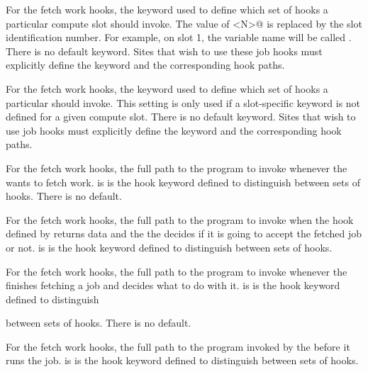 \begin{description}

\label{param:SlotNJobHookKeyword}
\item[\Macro{SLOT<N>\_JOB\_HOOK\_KEYWORD}]
  For the fetch work hooks,
  the keyword used to define which set of hooks a particular
  compute slot should invoke.
  The value of \verb@<N>@ is replaced by the slot
  identification number. For example, on slot 1, the variable name will be
  called \MacroNI{[SLOT1\_JOB\_HOOK\_KEYWORD}.
  There is no default keyword.
  Sites that wish to use these job hooks must explicitly define the
  keyword and the corresponding hook paths.

\label{param:StartdJobHookKeyword}
\item[\Macro{STARTD\_JOB\_HOOK\_KEYWORD}]
  For the fetch work hooks,
  the keyword used to define which set of hooks a particular
   should invoke.
  This setting is only used if a slot-specific keyword is not defined
  for a given compute slot.
  There is no default keyword.
  Sites that wish to use job hooks must explicitly define the
  keyword and the corresponding hook paths.

\label{param:HookFetchWork}
\item[\Macro{<Keyword>\_HOOK\_FETCH\_WORK}]
  For the fetch work hooks,
  the full path to the program to invoke whenever the 
  wants to fetch work.
   is is the hook keyword defined to distinguish
  between sets of hooks.
  There is no default.

\label{param:HookReplyFetch}
\item[\Macro{<Keyword>\_HOOK\_REPLY\_FETCH}]
  For the fetch work hooks,
  the full path to the program to invoke when the hook defined by
    returns data and the the 
  decides if it is going to accept the fetched job or not.
   is is the hook keyword defined to distinguish
  between sets of hooks.

\label{param:HookReplyClaim}
\item[\Macro{<Keyword>\_HOOK\_REPLY\_CLAIM}]
  For the fetch work hooks,
  the full path to the program to invoke whenever the 
  finishes fetching a job and decides what to do with it.
   is is the hook keyword defined to distinguish

  between sets of hooks.
  There is no default.

\label{param:HookPrepareJob}
\item[\Macro{<Keyword>\_HOOK\_PREPARE\_JOB}]
  For the fetch work hooks,
  the full path to the program invoked by the  before it
  runs the job.
   is is the hook keyword defined to distinguish
  between sets of hooks.


\end{description}
